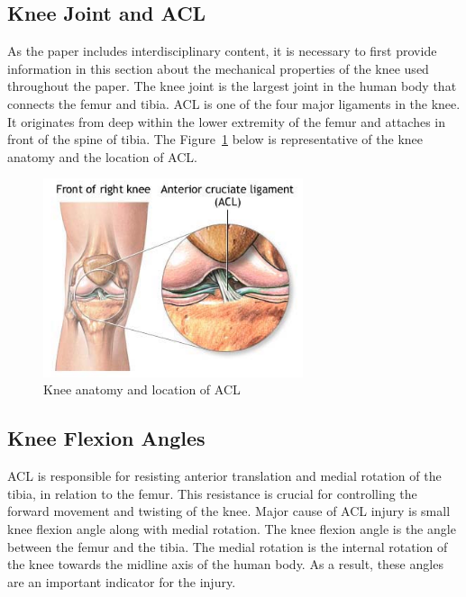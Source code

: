 \subsection{Knee Joint and ACL} 
As the paper includes interdisciplinary content, it is necessary to first provide information in this section about the mechanical properties of the knee used throughout the paper. The knee joint is the largest joint in the human body that connects the femur and tibia. ACL is one of the four major ligaments in the knee. It originates from deep within the lower extremity of the femur and attaches in front of the spine of tibia. The Figure~\ref{fig:knee_anatomy} below is representative of the knee anatomy and the location of ACL. 

\begin{figure}[h]
  \begin{center}
    \includegraphics[width=3in]{images/acl_anatomy.bmp}
  \end{center}
  \caption{Knee anatomy and location of ACL}
  \label{fig:knee_anatomy}
\end{figure}

\subsection{Knee Flexion Angles}
ACL is responsible for resisting anterior translation and medial rotation of the tibia, in relation to the femur. This resistance is crucial for controlling the forward movement and twisting of the knee. Major cause of ACL injury is small knee flexion angle along with medial rotation. The knee flexion angle is the angle between the femur and the tibia. The medial rotation is the internal rotation of the knee towards the midline axis of the human body. As a result, these angles are an important indicator for the injury.

